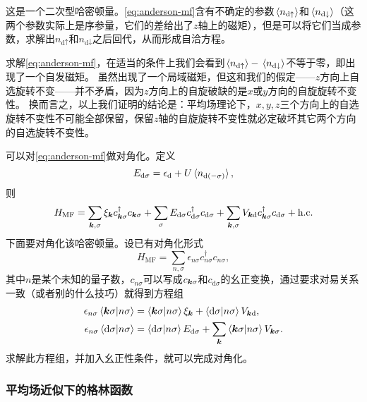 \documentclass[hyperref, UTF8, a4paper]{ctexart}
\begin{document}
这是一个二次型哈密顿量。\eqref{eq:anderson-mf}含有不确定的参数$\expval*{{n}_{\text{d} \uparrow}}$和$\expval*{{n}_{\text{d} \downarrow}}$（这两个参数实际上是序参量，它们的差给出了$z$轴上的磁矩），但是可以将它们当成参数，求解出${n}_{\text{d} \uparrow}$和${n}_{\text{d} \downarrow}$之后回代，从而形成自洽方程。

求解\eqref{eq:anderson-mf}，在适当的条件上我们会看到$\expval*{{n}_{\text{d} \uparrow}} - \expval*{{n}_{\text{d} \downarrow}}$不等于零，即出现了一个自发磁矩。
虽然出现了一个局域磁矩，但这和我们的假定——$z$方向上自选旋转不变——并不矛盾，因为$z$方向上的自旋破缺的是$x$或$y$方向的自旋旋转不变性。
换而言之，以上我们证明的结论是：平均场理论下，$x, y, z$三个方向上的自选旋转不变性不可能全部保留，保留$z$轴的自旋旋转不变性就必定破坏其它两个方向的自选旋转不变性。

可以对\eqref{eq:anderson-mf}做对角化。定义
\begin{equation}
    E_{\text{d} \sigma} = \epsilon_\text{d} + U \expval*{{n}_{\text{d} (-\sigma)}},
    \label{eq:energy-d-sigma}
\end{equation}
则
\begin{equation}
    {H}_\text{MF} = \sum_{\vb*{k}, \sigma} \xi_{\vb*{k}} {c}_{\vb*{k}\sigma}^\dagger {c}_{\vb*{k} \sigma} + \sum_\sigma E_{\text{d} \sigma} {c}_{\text{d}\sigma}^\dagger {c}_{\text{d} \sigma} + \sum_{\vb*{k}, \sigma} V_{\vb*{k} \text{d}} {c}_{\vb*{k} \sigma}^\dagger {c}_{\text{d} \sigma} + \text{h.c.}
\end{equation}
下面要对角化该哈密顿量。设已有对角化形式
\[
    {H}_\text{MF} = \sum_{n, \sigma} \epsilon_{n \sigma} {c}^\dagger_{n\sigma} {c}_{n\sigma},
\]
其中$n$是某个未知的量子数，${c}_{n \sigma}$可以写成${c}_{\vb*{k} \sigma}$和${c}_{\text{d} \sigma}$的幺正变换，通过要求对易关系一致（或者别的什么技巧）就得到方程组
\begin{equation}
    \begin{aligned}
        \epsilon_{n\sigma} \braket{\vb*{k}\sigma}{n \sigma} &= \braket{\vb*{k} \sigma}{n \sigma} \xi_{\vb*{k}} + \braket{\text{d} \sigma}{n \sigma} V_{\vb*{k} \text{d}}, \\
        \epsilon_{n \sigma} \braket{\text{d} \sigma}{n \sigma} &= \braket{\text{d} \sigma}{n \sigma} E_{\text{d} \sigma} + \sum_{\vb*{k}} \braket{\vb*{k} \sigma}{n \sigma} V_{\vb*{k} \sigma}.
    \end{aligned}
\end{equation}
求解此方程组，并加入幺正性条件，就可以完成对角化。

\subsubsection{平均场近似下的格林函数}
\end{document}
